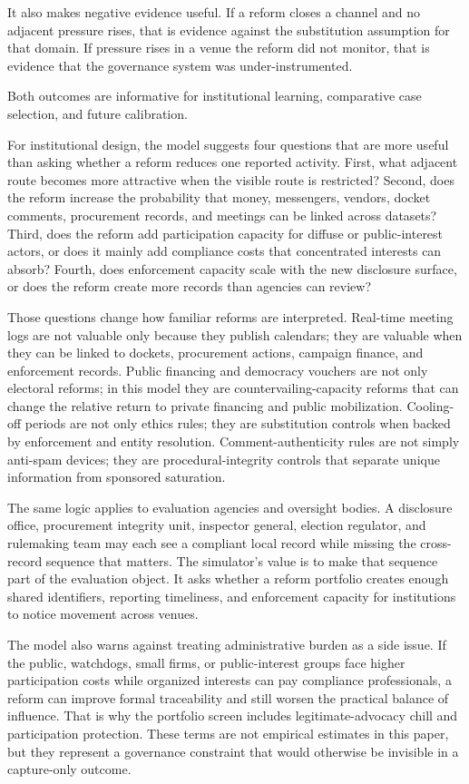 It also makes negative evidence useful. If a reform closes a channel and no adjacent pressure rises, that is evidence against the substitution assumption for that domain. If pressure rises in a venue the reform did not monitor, that is evidence that the governance system was under-instrumented.

Both outcomes are informative for institutional learning, comparative case selection, and future calibration.

For institutional design, the model suggests four questions that are more useful than asking whether a reform reduces one reported activity. First, what adjacent route becomes more attractive when the visible route is restricted? Second, does the reform increase the probability that money, messengers, vendors, docket comments, procurement records, and meetings can be linked across datasets? Third, does the reform add participation capacity for diffuse or public-interest actors, or does it mainly add compliance costs that concentrated interests can absorb? Fourth, does enforcement capacity scale with the new disclosure surface, or does the reform create more records than agencies can review?

Those questions change how familiar reforms are interpreted. Real-time meeting logs are not valuable only because they publish calendars; they are valuable when they can be linked to dockets, procurement actions, campaign finance, and enforcement records. Public financing and democracy vouchers are not only electoral reforms; in this model they are countervailing-capacity reforms that can change the relative return to private financing and public mobilization. Cooling-off periods are not only ethics rules; they are substitution controls when backed by enforcement and entity resolution. Comment-authenticity rules are not simply anti-spam devices; they are procedural-integrity controls that separate unique information from sponsored saturation.

The same logic applies to evaluation agencies and oversight bodies. A disclosure office, procurement integrity unit, inspector general, election regulator, and rulemaking team may each see a compliant local record while missing the cross-record sequence that matters. The simulator's value is to make that sequence part of the evaluation object. It asks whether a reform portfolio creates enough shared identifiers, reporting timeliness, and enforcement capacity for institutions to notice movement across venues.

The model also warns against treating administrative burden as a side issue. If the public, watchdogs, small firms, or public-interest groups face higher participation costs while organized interests can pay compliance professionals, a reform can improve formal traceability and still worsen the practical balance of influence. That is why the portfolio screen includes legitimate-advocacy chill and participation protection. These terms are not empirical estimates in this paper, but they represent a governance constraint that would otherwise be invisible in a capture-only outcome.

